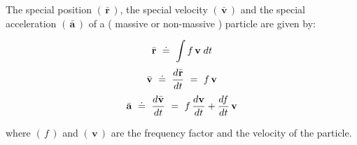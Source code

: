 \documentclass[10pt,fleqn]{article}
\begin{document}
\bigskip \smallskip

\noindent The special position $( \, \bar{\mathbf{r}} \, )$, the special velocity $( \, \bar{\mathbf{v}} \, )$ and the special acceleration $( \, \bar{\mathbf{a}} \, )$ of a ( massive or non-massive ) particle are given by:
\par \vspace{-0.30em}
\begin{eqnarray*}
\bar{\mathbf{r}} ~\doteq~ \int f \, \mathbf{v} \; d\hspace{+0.012em}t
\end{eqnarray*}
\vspace{-0.60em}
\begin{eqnarray*}
\bar{\mathbf{v}} ~\doteq~ \dfrac{d\hspace{+0.036em}\bar{\mathbf{r}}}{d\hspace{+0.012em}t} ~=~ f \, \mathbf{v}
\end{eqnarray*}
\vspace{-0.45em}
\begin{eqnarray*}
\bar{\mathbf{a}} ~\doteq~ \dfrac{d\hspace{+0.021em}\bar{\mathbf{v}}}{d\hspace{+0.012em}t} ~=~ f \, \dfrac{d\hspace{+0.021em}\mathbf{v}}{d\hspace{+0.012em}t} + \dfrac{d\hspace{-0.12em}f}{d\hspace{+0.012em}t} \, \mathbf{v}
\end{eqnarray*}
\par \vspace{+1.20em}
\noindent where $( \, f \, )$ and $( \, \mathbf{v} \, )$ are the frequency factor and the velocity of the particle.

\vspace{+0.60em}

\par {}

\bigskip \smallskip
\end{document}
